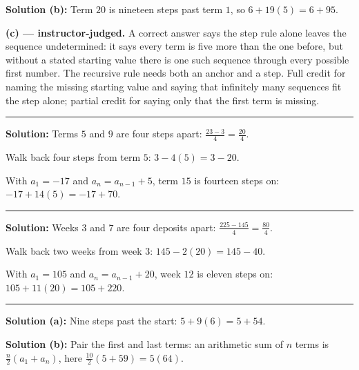 \documentclass[12pt]{article}
\begin{document}
\textbf{Solution (b):} Term $20$ is nineteen steps past term $1$, so $6 + 19(5) = 6 + 95$. 

\textbf{(c) --- instructor-judged.} A correct answer says the step rule alone leaves the sequence undetermined: it says every term is five more than the one before, but without a stated starting value there is one such sequence through every possible first number. The recursive rule needs both an anchor and a step. Full credit for naming the missing starting value and saying that infinitely many sequences fit the step alone; partial credit for saying only that the first term is missing.

\vspace{0.2cm}\noindent\rule{\linewidth}{0.2pt}


\textbf{Solution:} Terms $5$ and $9$ are four steps apart: $\frac{23 - 3}{4} = \frac{20}{4}$. 

Walk back four steps from term $5$: $3 - 4(5) = 3 - 20$. 

With $a_1 = -17$ and $a_n = a_{n-1} + 5$, term $15$ is fourteen steps on: $-17 + 14(5) = -17 + 70$. 

\vspace{0.2cm}\noindent\rule{\linewidth}{0.2pt}


\textbf{Solution:} Weeks $3$ and $7$ are four deposits apart: $\frac{225 - 145}{4} = \frac{80}{4}$. 

Walk back two weeks from week $3$: $145 - 2(20) = 145 - 40$. 

With $a_1 = 105$ and $a_n = a_{n-1} + 20$, week $12$ is eleven steps on: $105 + 11(20) = 105 + 220$. 

\vspace{0.2cm}\noindent\rule{\linewidth}{0.2pt}


\textbf{Solution (a):} Nine steps past the start: $5 + 9(6) = 5 + 54$. 

\textbf{Solution (b):} Pair the first and last terms: an arithmetic sum of $n$ terms is $\frac{n}{2}(a_1 + a_n)$, here $\frac{10}{2}(5 + 59) = 5(64)$. 
\end{document}
